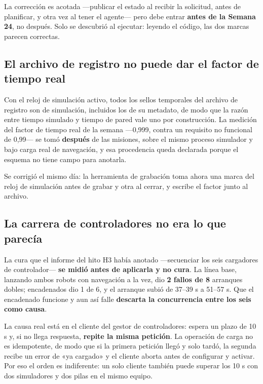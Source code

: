 \documentclass[12pt,letterpaper]{article}
\begin{document}
La corrección es acotada ---publicar el estado al recibir la solicitud, antes de planificar, y otra vez al tener el agente--- pero debe entrar \textbf{antes de la Semana 24}, no después. Solo se descubrió al ejecutar: leyendo el código, las dos marcas parecen correctas.

\subsection{El archivo de registro no puede dar el factor de tiempo real}

Con el reloj de simulación activo, todos los sellos temporales del archivo de registro son de simulación, incluidos los de su metadato, de modo que la razón entre tiempo simulado y tiempo de pared vale uno por construcción. La medición del factor de tiempo real de la semana ---0,999, contra un requisito no funcional de 0,99--- se tomó \textbf{después} de las misiones, sobre el mismo proceso simulador y bajo carga real de navegación, y esa procedencia queda declarada porque el esquema no tiene campo para anotarla.

Se corrigió el mismo día: la herramienta de grabación toma ahora una marca del reloj de simulación antes de grabar y otra al cerrar, y escribe el factor junto al archivo.

\subsection{La carrera de controladores no era lo que parecía}

La cura que el informe del hito H3 había anotado ---secuenciar los seis cargadores de controlador--- \textbf{se midió antes de aplicarla y no cura}. La línea base, lanzando ambos robots con navegación a la vez, dio \textbf{2 fallos de 8} arranques dobles; encadenados dio 1 de 6, y el arranque subió de 37--39 s a 51--57 s. Que el encadenado funcione y aun así falle \textbf{descarta la concurrencia entre los seis como causa}.

La causa real está en el cliente del gestor de controladores: espera un plazo de 10 s y, si no llega respuesta, \textbf{repite la misma petición}. La operación de carga no es idempotente, de modo que si la primera petición llegó y solo tardó, la segunda recibe un error de «ya cargado» y el cliente aborta antes de configurar y activar. Por eso el orden es indiferente: un solo cliente también puede superar los 10 s con dos simuladores y dos pilas en el mismo equipo.
\end{document}
